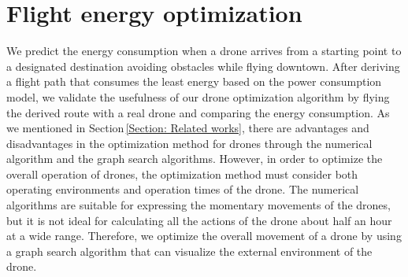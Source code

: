 \documentclass[journal]{./template/IEEEtran}
\begin{document}

\section{Flight energy optimization}
\label{Section: Optimization}

We predict the energy consumption when a drone arrives from a starting point to a designated destination avoiding obstacles while flying downtown. 
After deriving a flight path that consumes the least energy based on the power consumption model, we validate the usefulness of our drone optimization algorithm by flying the derived route with a real drone and comparing the energy consumption.
As we mentioned in Section\,\ref{Section: Related works}, there are advantages and disadvantages in the optimization method for drones through the numerical algorithm and the graph search algorithms.
However, in order to optimize the overall operation of drones, the optimization method must consider both operating environments and operation times of the drone.
The numerical algorithms are suitable for expressing the momentary movements of the drones, but it is not ideal for calculating all the actions of the drone about half an hour at a wide range.
Therefore, we optimize the overall movement of a drone by using a graph search algorithm that can visualize the external environment of the drone.
\end{document}
